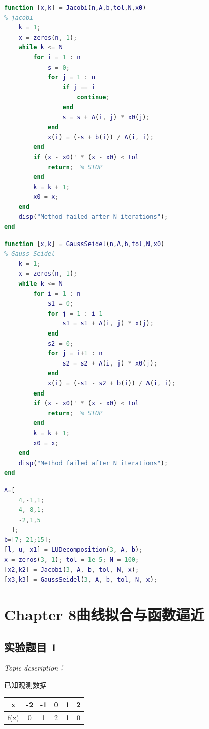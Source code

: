 \documentclass[12pt]{ctexart}
\begin{document}
\begin{lstlisting}[language = MATLAB]
function [x,k] = Jacobi(n,A,b,tol,N,x0)
% jacobi
	k = 1;
	x = zeros(n, 1);
	while k <= N
		for i = 1 : n
			s = 0;
			for j = 1 : n
				if j == i
					continue;
				end
				s = s + A(i, j) * x0(j);
			end
			x(i) = (-s + b(i)) / A(i, i);
		end
		if (x - x0)' * (x - x0) < tol
			return;  % STOP
		end
		k = k + 1;
		x0 = x;
	end
	disp("Method failed after N iterations");
end
\end{lstlisting}

\begin{lstlisting}[language = MATLAB]
function [x,k] = GaussSeidel(n,A,b,tol,N,x0)
% Gauss Seidel
	k = 1;
	x = zeros(n, 1);
	while k <= N
		for i = 1 : n
			s1 = 0;
			for j = 1 : i-1
				s1 = s1 + A(i, j) * x(j);
			end
			s2 = 0;
			for j = i+1 : n
				s2 = s2 + A(i, j) * x0(j);
			end
			x(i) = (-s1 - s2 + b(i)) / A(i, i);
		end
		if (x - x0)' * (x - x0) < tol
			return;  % STOP
		end
		k = k + 1;
		x0 = x;
	end
	disp("Method failed after N iterations");
end
\end{lstlisting}

\begin{lstlisting}[language = MATLAB]
% 第6 7章 第1题
A=[
	4,-1,1;
	4,-8,1;
	-2,1,5
  ];
b=[7;-21;15];
[l, u, x1] = LUDecomposition(3, A, b);
x = zeros(3, 1); tol = 1e-5; N = 100;
[x2,k2] = Jacobi(3, A, b, tol, N, x);
[x3,k3] = GaussSeidel(3, A, b, tol, N, x);
\end{lstlisting}

\newpage
	
\newpage
	\section{Chapter 8\quad 曲线拟合与函数逼近}
	\label{sec:8}
	
	\subsection{实验题目 1}
	\textit{Topic description：}
	
	已知观测数据
	\begin{table}[htbp]
	\centering
		\begin{tabular}
			{c|c|c|c|c|c}
			\hline
			x&-2&-1&0&1&2 \\
			\hline
			f(x)&0&1&2&1&0 \\
			\hline
		\end{tabular}
	\end{table}
\end{document}
